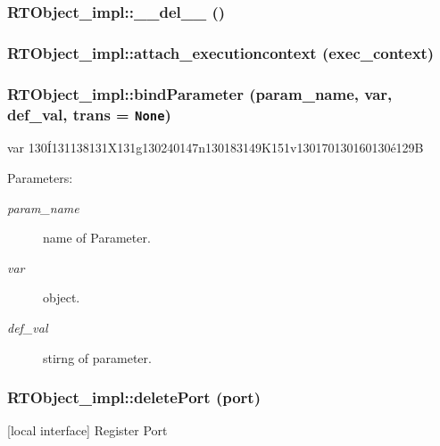\subsubsection{\setlength{\rightskip}{0pt plus 5cm}RTObject\_\-impl::\_\-\_\-del\_\-\_\- ()}\label{classRTObject__impl_RTObject__impla0}


\subsubsection{\setlength{\rightskip}{0pt plus 5cm}RTObject\_\-impl::attach\_\-executioncontext (exec\_\-context)}\label{classRTObject__impl_RTObject__impla22}


\subsubsection{\setlength{\rightskip}{0pt plus 5cm}RTObject\_\-impl::bind\-Parameter (param\_\-name, var, def\_\-val, trans = {\tt None})}\label{classRTObject__impl_RTObject__impla60}


var 130\'{I}131138131X131g130240147n130183149K151v130170130160130\'{e}129B 

\begin{Desc}
\item[Parameters:]
\begin{description}
\item[{\em param\_\-name}]name of Parameter. \item[{\em var}]object. \item[{\em def\_\-val}]stirng of parameter.\end{description}
\end{Desc}
\subsubsection{\setlength{\rightskip}{0pt plus 5cm}RTObject\_\-impl::delete\-Port (port)}\label{classRTObject__impl_RTObject__impla65}


[local interface] Register Port 

